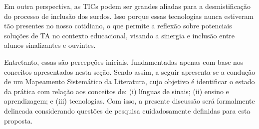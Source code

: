 Em outra perspectiva, as TICs podem ser grandes aliadas para a desmistificação do processo de inclusão dos surdos. Isso porque essas tecnologias nunca estiveram tão presentes no nosso cotidiano, o que permite a reflexão sobre potenciais soluções de TA no contexto educacional, visando a sinergia e inclusão entre alunos sinalizantes e ouvintes.

Entretanto, essas são percepções iniciais, fundamentadas apenas com base nos conceitos apresentados nesta seção. Sendo assim, a seguir apresenta-se a condução de um Mapeamento Sistemático da Literatura, cujo objetivo é identificar o estado da prática com relação aos conceitos de: (i) línguas de sinais; (ii) ensino e aprendizagem; e (iii) tecnologias. Com isso, a presente discussão será formalmente delineada considerando questões de pesquisa cuidadosamente definidas para esta proposta.
